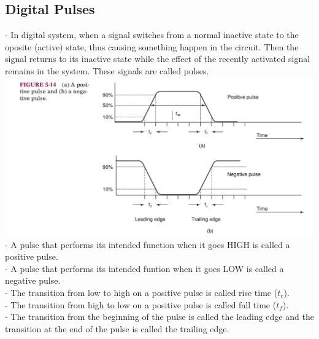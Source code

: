 \documentclass[12pt]{article}
\begin{document}
\subsection{Digital Pulses}
- In digital system, when a signal switches from a normal inactive state to the oposite (active) state, thus causing something happen in the circuit. Then the signal returns to its inactive state while the effect of the recently activated signal remains in the system. These signals are called pulses.\\
\includegraphics[scale=0.7]{hinh7}
\bigbreak
- A pulse that performs its intended function when it goes HIGH is called a positive pulse. \\
- A pulse that performs its intended funtion when it goes LOW is called a negative pulse. \\
- The transition from low to high on a positive pulse is called rise time ($t_r$). \\
- The transition from high to low on a positive pulse is called fall time ($t_f$). \\
- The transition from the beginning of the pulse is called the leading edge and the transition at the end of the pulse is called the trailing edge. \\
\end{document}
